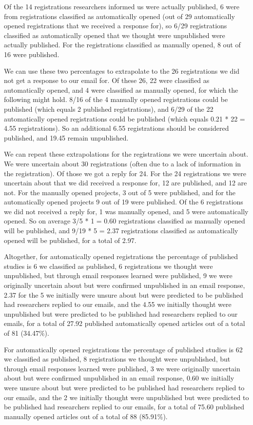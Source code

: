 \documentclass[
  ,jou, a4paper,floatsintext]{apa6}
\begin{document}
Of the 14 registrations researchers informed us were actually published, 6 were from registrations classified as automatically opened (out of 29 automatically opened registrations that we received a response for), so 6/29 registrations classified as automatically opened that we thought were unpublished were actually published. For the registrations classified as manually opened, 8 out of 16 were published.

We can use these two percentages to extrapolate to the 26 registrations we did not get a response to our email for. Of these 26, 22 were classified as automatically opened, and 4 were classified as manually opened, for which the following might hold. 8/16 of the 4 manually opened registrations could be published (which equals 2 published registrations), and 6/29 of the 22 automatically opened registrations could be published (which equals 0.21 * 22 = 4.55 registrations). So an additional 6.55 registrations should be considered published, and 19.45 remain unpublished.

We can repeat these extrapolations for the registrations we were uncertain about. We were uncertain about 30 registrations (often due to a lack of information in the registration). Of those we got a reply for 24. For the 24 registrations we were uncertain about that we did received a response for, 12 are published, and 12 are not. For the manually opened projects, 3 out of 5 were published, and for the automatically opened projects 9 out of 19 were published. Of the 6 registrations we did not received a reply for, 1 was manually opened, and 5 were automatically opened. So on average 3/5 * 1 = 0.60 registrations classified as manually opened will be published, and 9/19 * 5 = 2.37 registrations classified as automatically opened will be published, for a total of 2.97.

Altogether, for automatically opened registrations the percentage of published studies is 6 we classified as published, 6 registrations we thought were unpublished, but through email responses learned were published, 9 we were originally uncertain about but were confirmed unpublished in an email response, 2.37 for the 5 we initially were unsure about but were predicted to be published had researchers replied to our emails, and the 4.55 we initially thought were unpublished but were predicted to be published had researchers replied to our emails, for a total of 27.92 published automatically opened articles out of a total of 81 (34.47\%).

For automatically opened registrations the percentage of published studies is 62 we classified as published, 8 registrations we thought were unpublished, but through email responses learned were published, 3 we were originally uncertain about but were confirmed unpublished in an email response, 0.60 we initially were unsure about but were predicted to be published had researchers replied to our emails, and the 2 we initially thought were unpublished but were predicted to be published had researchers replied to our emails, for a total of 75.60 published manually opened articles out of a total of 88 (85.91\%).
\end{document}
